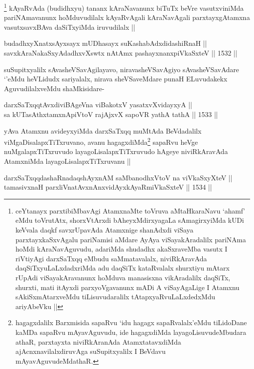 \begin{artha}
\footnote{ceYtanayx parxtibiMbavAgi AtamxnaMte toVruva aMtaHkaraNavu `ahamf' eMdu toVrutAtx, shorxVtArxdi bAheyxMdirxyagaLa sAmagirxyiMda kUDi keVvala daqkf savxrUpavAda Atamxnige shanAdxdi viSaya parxtayxkaSxvAgalu pariNamisi aMdare AyAya viSayakAradalilx pariNAma hoMdi kAraNavAguvudu, adariMda shudadhx akaSxraveMba vasutx I riVtiyAgi darxSaTxqq eMbudu saMmatavalalx, niviRkAravAda daqSiTxyuLaLxdadxriMda adu daqSiTx kataRvalalx shurxtiyu mAtarx rUpAdi viSayakAravanunx hoMduva manasisxna vikAradalilx daqSiTx, shurxti, mati itAyxdi parxyoVgavanunx mADi A viSayAgaLige I Atamxnu sAkiSxmAtarxveMdu tiLisuvudaralilx tAtapxyaRvuLaLxdedxMdu ariyAbeVku ||}
kAyaRvAda (budidhxyu) tananx kAraNavanunx biTuTx beVre vasutxviniMda pariNAmavanunx hoMduvudilalx kAyaRvAgali kAraNavAgali parxtayxgAtamxna vasutxsavxBAva daSiTxyiMda iruvudilalx ||
\end{artha}
\begin{shl}
budadhxyXnatxsAyxsayx mUDhasayx suKashabAdxdidashiRnaH || \\
savxkAraNakaSxyAdadhxvXswtx nA\s \s tAmx pashayxnanxpiVkaSxteV ||  1532 ||  
\end{shl}
				
\begin{artha}
suSupitxyalilx sAvasheVSavAgilayavo, niravasheVSavAgiyo sAvasheVSavAdare `\stext'eMdu heVLidudx sariyalalx, nirava sheVSaveMdare punaH ELuvudakekx AguvudilalxveMdu shaMkisidare-
\end{artha}

\begin{shl}
darxSaTxqqtAvxdiviBAgeVna viBakotxV yasatxvXvidayxyA ||  \\
sa kUTasAthxtamxnA\s piVtoV rajAjxvX sapoVR yathA tathA ||  1533 ||  
\end{shl}

\begin{artha}
yAva Atamxnu avideyxyiMda darxSaTxqq muMtAda BeVdadalilx viMgaDisalapxTiTxruvano, avanu hagagxdiMda\footnote{hagagxdalilx Barxmisida sapaRvu `idu hagagx sapaRvalalx'eMdu tiLidoDane kaMDa sapaRvu mAyavAguvudu, ide hagagxdiMda layagoLisuvudeMbudara athaR, parxtayxta niviRkAranAda AtamxtatavxdiMda ajAcnxnavilalxdiruvAga suSupitxyalilx I BeVdavu mAyavAguvudeMdathaR.} sapaRvu heVge nuMgalapxTiTxruvudo layagoLisalapxTiTxruvudo hAgeye niviRkAravAda AtamxniMda layagoLisalapxTiTxruvanu ||
\end{artha}

\begin{shl}
darxSaTxqqdashaRnadaqshAyxnAM saMbanodhxV\s toV na viVkaSxyXteV || \\
tamasivxnaH parxliVnatAvxnAnxvidAyxkAyaRmiVkaSxteV ||  1534 ||  
\end{shl}

